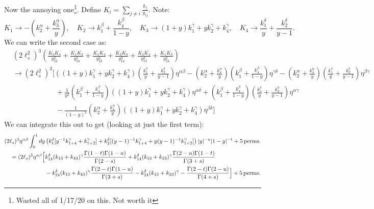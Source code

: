 \documentclass[11pt, class=article, crop=false]{standalone}
\begin{document}
\begin{enumerate}
	Now the annoying one\footnote{Wasted all of 1/17/20 on this. Not worth it}. Define $K_i = \sum_{j \neq i} \tfrac{k_j}{y_{ij}}$. Note:
	\[
		K_1 \to -(k_2^\alpha + \frac{k_3^\alpha}{y}), 
		\quad K_2 \to k_1^\beta + \frac{k_4^\beta}{1-y}, 
		\quad K_3 \to (1+y)k_1^\gamma + y k_2^\gamma + k_4^\gamma, 
		\quad K_4 \to \frac{k_1^\delta}{y} + \frac{k_2^\delta}{y-1}.
	\]
	We can write the second case as:
	\[
	\begin{aligned}
		&\left(2 \ell_s^2\right)^3 \left(\frac{K_3 K_4}{y_{12}^2} + \frac{K_1 K_2}{y_{34}^2} + \frac{K_1 K_4}{y_{23}^2} + \frac{K_2 K_3}{y_{14}^2} + \frac{K_2 K_4}{y_{13}^2} + \frac{K_1 K_3}{y_{24}^2} \right) \\
		& \to \left(2 \ell_s^2\right)^3 \Big[
		((1+y)k_1^\gamma + y k_2^\gamma + k_4^\gamma)(\tfrac{k_1^\delta}{y} + \tfrac{k_2^\delta}{y-1}) \eta^{\alpha \beta}
		-(k_2^\alpha + \tfrac{k_4^\alpha}{y})(k_1^\beta + \tfrac{k_4^\beta}{1-y}) \eta^{\gamma \delta}
		-(k_2^\alpha + \tfrac{k_4^\alpha}{y})(\tfrac{k_1^\delta}{y} + \tfrac{k_2^\delta}{y-1}) \eta^{\beta \gamma}
		\\ & \qquad \qquad \qquad + \tfrac{1}{y^2}(k_1^\beta + \tfrac{k_4^\beta}{1-y}) ((1+y)k_1^\gamma + y k_2^\gamma + k_4^\gamma) \eta^{\alpha \delta}
		+ (k_1^\beta + \tfrac{k_4^\beta}{1-y}) (\tfrac{k_1^\delta}{y} + \tfrac{k_2^\delta}{y-1}) \eta^{\alpha \gamma}\\
		& \qquad \qquad \qquad - \tfrac{1}{(1-y)^2} (k_2^\alpha + \tfrac{k_4^\alpha}{y}) ((1+y)k_1^\gamma + y k_2^\gamma + k_4^\gamma) \eta^{\beta \delta}
		\Big]
	\end{aligned}
	\]
	We can integrate this out to get (looking at just the first term):
	\begin{equation}\label{eq:part2}
		\begin{aligned}
			(2 \ell_s)^3 \eta^{\alpha \beta} \int_0^1 dy & \left(k_1^\delta [y^{-1} k_{1+4}^\gamma + k_{1+2}^\gamma] + k_2^\delta[ (y-1)^{-1} k_{1+4}^\gamma + y (y-1)^{-1} k_{1+2}^\gamma] \right) |y|^{-u} |1-y|^{-t} + 5 \,\mathrm{perms.} \\
			=(2\ell_s)^3 \eta^{\alpha \beta} \Big[& k_{14}^\delta (k_{13} + k_{43})^\gamma \frac{\Gamma(1-t) \Gamma(1-u)}{\Gamma(2-s)}  + k_{14}^\delta  (k_{13} + k_{23})^\gamma \frac{\Gamma(2-u) \Gamma(1-t)}{\Gamma(3+s)}  \\
		& - k_{24}^\delta (k_{13}+ k_{43})^\gamma  \frac{\Gamma(2-t) \Gamma(1-u)}{\Gamma(3+s)} - k_{24}^\delta (k_{13} + k_{23})^\gamma - \frac{\Gamma(2-t) \Gamma(2-u)}{\Gamma(4+s)} \Big] + 5 \,\mathrm{perms.}
		\end{aligned}
	\end{equation}

\end{enumerate}
\end{document}
